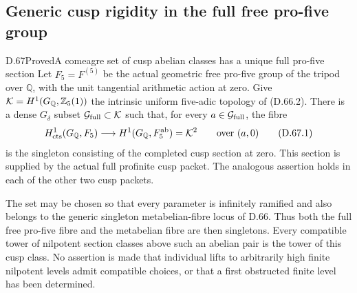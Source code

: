 \subsection{Generic cusp rigidity in the full free pro-five group}

\begin{statement}{D.67}{Proved}{A comeagre set of cusp abelian classes has a unique full pro-five section}
Let \(F_5=F^{(5)}\) be the actual geometric free pro-five group of
the tripod over \(\mathbb Q\), with the unit tangential arithmetic
action at zero. Give
\({\cal K}=H^1(G_{\mathbb Q},\mathbb Z_5(1))\) the intrinsic
uniform five-adic topology of (D.66.2). There is a dense
\(G_\delta\) subset \({\cal G}_{\rm full}\subset{\cal K}\)
such that, for every \(a\in{\cal G}_{\rm full}\), the fibre
\[
 H^1_{\mathrm{cts}}(G_{\mathbb Q},F_5)
       \longrightarrow H^1(G_{\mathbb Q},F_5^{\rm ab})
                       ={\cal K}^2
 \qquad\text{over }(a,0)                               \tag{D.67.1}
\]
is the singleton consisting of the completed cusp section
at zero. This section is supplied by the actual full
profinite cusp packet. The analogous assertion holds in
each of the other two cusp packets.

The set may be chosen so that every parameter is infinitely
ramified and also belongs to the generic singleton
metabelian-fibre locus of D.66. Thus both the full free
pro-five fibre and the metabelian fibre are then singletons.
Every compatible tower of nilpotent section classes
above such an abelian pair is the tower of this cusp class.
No assertion is made that individual lifts to arbitrarily
high finite nilpotent levels admit compatible choices,
or that a first obstructed finite level has been determined.
\end{statement}


